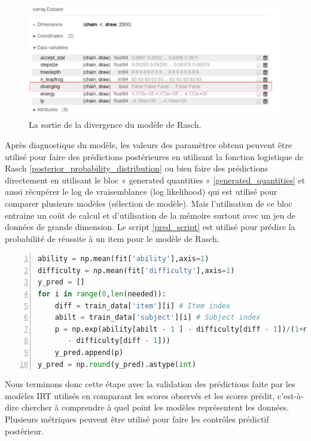 \begin{figure}[H]
	\begin{center}
		\includegraphics[width=\textwidth]{images/chapitre7/diverging_output.png}
	\end{center}
	\caption{La sortie de la divergence du modèle de Rasch.}
	\label{diverging_output}
\end{figure}

\noindent Après diagnostique du modèle, les valeurs des paramètres obtenu peuvent être utilisé pour faire des prédictions postérieures en utilisant la fonction logistique de Rasch \ref{posterior_probability_distribution} ou bien faire des prédictions directement en utilisant le bloc « generated quantities » \ref{generated_quantities} et aussi récupérer le log de vraisemblance (log likelihood) qui est utilisé pour comparer plusieurs modèles (sélection de modèle). Mais l’utilisation de ce bloc entraine un coût de calcul et d’utilisation de la mémoire surtout avec un jeu de données de grande dimension. Le script \ref{pred_script} est utilisé pour prédire la probabilité de réussite à un item pour le modèle de Rasch.

\begin{lstlisting}[language=Python,label={pred_script},stringstyle=\color{deepgreen},basicstyle=\scriptsize, frame=l,framesep=4.5mm,framexleftmargin=2.5mm,tabsize=2,numbers=left,fillcolor=\color{blueforest!70},rulecolor=\color{blueforest},numberstyle=\normalfont\tiny\color{white}]
ability = np.mean(fit['ability'],axis=1)
difficulty = np.mean(fit['difficulty'],axis=1)
y_pred = []
for i in range(0,len(needed)):
	diff = train_data['item'][i] # Item index
	abilt = train_data['subject'][i] # Subject index
	p = np.exp(ability[abilt - 1 ] - difficulty[diff - 1])/(1+np.exp(ability[abilt - 1] 
	   - difficulty[diff - 1]))
	y_pred.append(p)
y_pred = np.round(y_pred).astype(int)
\end{lstlisting}

\noindent Nous terminons donc cette étape avec la validation des prédictions faite par les modèles IRT utilisés en comparant les scores observés et les scores prédit, c’est-à-dire chercher à comprendre à quel point les modèles représentent les données. Plusieurs métriques peuvent être utilisé pour faire les contrôles prédictif postérieur.

